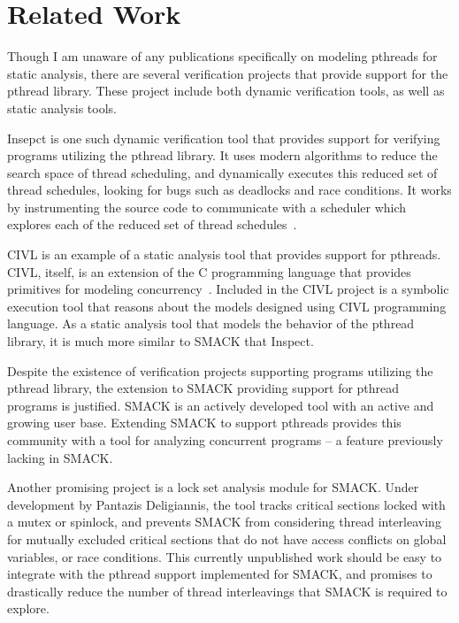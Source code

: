 \chapter{Related Work}\label{thesis_relatedwork}
Though I am unaware of any publications specifically on modeling
pthreads for static analysis, there are several verification projects
that provide support for the pthread library.  These project include
both dynamic verification tools, as well as static analysis tools.

Insepct is one such dynamic verification tool that provides support
for verifying programs utilizing the pthread library.  It uses modern 
algorithms to reduce the search space of thread scheduling, and
dynamically executes this reduced set of thread schedules, looking for
bugs such as deadlocks and race conditions.  It works by instrumenting
the source code to communicate with a scheduler which explores each of
the reduced set of thread schedules~\cite{inspect}.

CIVL is an example of a static analysis tool that provides support for
pthreads.  CIVL, itself, is an extension of the C programming
language that provides primitives for modeling
concurrency~\cite{civl}.  Included in the CIVL project is a symbolic
execution tool that reasons about the models designed using CIVL
programming language.  As a static analysis tool that models the
behavior of the pthread library, it is much more similar to SMACK that
Inspect. 

Despite the existence of verification projects supporting programs
utilizing the pthread library, the extension to SMACK providing
support for pthread programs is justified.  SMACK is an actively
developed tool with an active and growing user base.  Extending SMACK
to support pthreads provides this community with a tool for analyzing
concurrent programs -- a feature previously lacking in SMACK.

Another promising project is a lock set analysis module for SMACK.
Under development by Pantazis Deligiannis, the tool tracks critical
sections locked with a mutex or spinlock, and prevents SMACK from
considering thread interleaving for mutually excluded critical
sections that do not have access conflicts on global variables, or
race conditions. This currently unpublished work should be easy to
integrate with the pthread support implemented for SMACK, and promises
to drastically reduce the number of thread interleavings that SMACK is
required to explore.  


